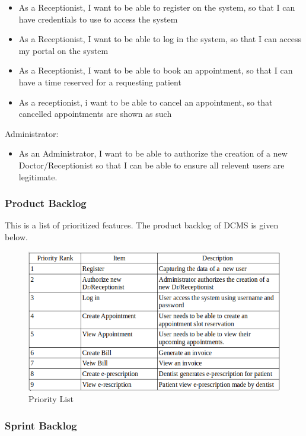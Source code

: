\documentclass[11 pt]{article}
\begin{document}
    \begin{itemize}
  \item
  As a Receptionist, I want to be able to register on the system, so that I can have credentials to use to access the system
  \item
  As a Receptionist, I want to be able to log in the system, so that I can access my portal on the system
  \item
  As a Receptionist, I want to be able to book an appointment, so that I can 				have a time reserved for a requesting patient
  \item
   As a receptionist,  i want to be able to cancel an appointment, so that cancelled appointments are shown as such
   \end{itemize}
   Administrator:
   \begin{itemize}
   \item
   As an Administrator, I want to be able to authorize the creation of a new Doctor/Receptionist so that I can be able to ensure all relevent users are legitimate.
   \end{itemize}
  \subsubsection{Product Backlog}
  This is a list of prioritized features. The product backlog of DCMS is given below.
  
  \begin{figure}[h]
    \centering
    
    \includegraphics[width=\linewidth]{PriorityList.png}
    \caption{Priority List}
    \label{fig:ERD}
    \end{figure}
    
  \subsubsection{Sprint Backlog}
  \
\end{document}
